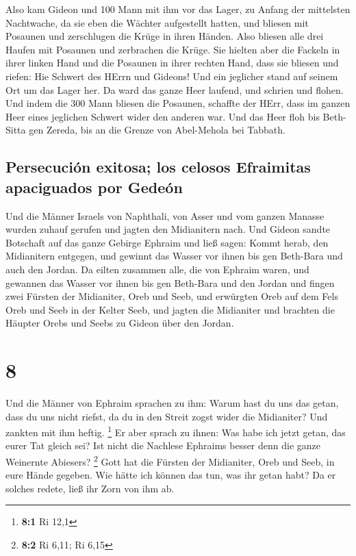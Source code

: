  Also kam Gideon und 100 Mann mit ihm vor das Lager, zu
Anfang der mittelsten Nachtwache, da sie eben die Wächter aufgestellt
hatten, und bliesen mit Posaunen und zerschlugen die Krüge in ihren
Händen.  Also bliesen alle drei Haufen mit Posaunen und
zerbrachen die Krüge. Sie hielten aber die Fackeln in ihrer linken Hand
und die Posaunen in ihrer rechten Hand, dass sie bliesen und riefen: Hie
Schwert des HErrn und Gideons!  Und ein jeglicher stand
auf seinem Ort um das Lager her. Da ward das ganze Heer laufend, und
schrien und flohen.  Und indem die 300 Mann bliesen die
Posaunen, schaffte der HErr, dass im ganzen Heer eines jeglichen Schwert
wider den anderen war. Und das Heer floh bis Beth-Sitta gen Zereda, bis
an die Grenze von Abel-Mehola bei Tabbath.

\hypertarget{persecuciuxf3n-exitosa-los-celosos-efraimitas-apaciguados-por-gedeuxf3n}{%
\subsection{Persecución exitosa; los celosos Efraimitas apaciguados por
Gedeón}\label{persecuciuxf3n-exitosa-los-celosos-efraimitas-apaciguados-por-gedeuxf3n}}

 Und die Männer Israels von Naphthali, von Asser und vom
ganzen Manasse wurden zuhauf gerufen und jagten den Midianitern nach.
 Und Gideon sandte Botschaft auf das ganze Gebirge
Ephraim und ließ sagen: Kommt herab, den Midianitern entgegen, und
gewinnt das Wasser vor ihnen bis gen Beth-Bara und auch den Jordan. Da
eilten zusammen alle, die von Ephraim waren, und gewannen das Wasser vor
ihnen bis gen Beth-Bara und den Jordan  und fingen zwei
Fürsten der Midianiter, Oreb und Seeb, und erwürgten Oreb auf dem Fels
Oreb und Seeb in der Kelter Seeb, und jagten die Midianiter und brachten
die Häupter Orebs und Seebs zu Gideon über den Jordan.

\hypertarget{section-7}{%
\section{8}\label{section-7}}

 Und die Männer von Ephraim sprachen zu ihm: Warum hast du
uns das getan, dass du uns nicht riefst, da du in den Streit zogst wider
die Midianiter? Und zankten mit ihm heftig. \footnote{\textbf{8:1} Ri
  12,1}  Er aber sprach zu ihnen: Was habe ich jetzt
getan, das eurer Tat gleich sei? Ist nicht die Nachlese Ephraims besser
denn die ganze Weinernte Abiesers? \footnote{\textbf{8:2} Ri 6,11; Ri
  6,15}  Gott hat die Fürsten der Midianiter, Oreb und
Seeb, in eure Hände gegeben. Wie hätte ich können das tun, was ihr getan
habt? Da er solches redete, ließ ihr Zorn von ihm ab.


